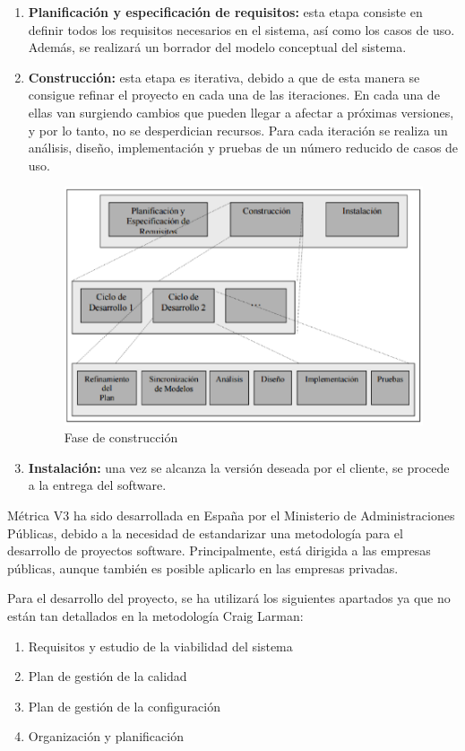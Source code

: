 \begin{enumerate}[1.]
\item \textbf{Planificación y especificación de requisitos:} esta etapa consiste en definir todos los requisitos necesarios en el sistema, así como los casos de uso. Además, se realizará un borrador del modelo conceptual del sistema.
\item \textbf{Construcción:} esta etapa es iterativa, debido a que de esta manera se consigue refinar el proyecto en cada una de las iteraciones. En cada una de ellas van surgiendo cambios que pueden llegar a afectar a próximas versiones, y por lo tanto, no se desperdician recursos. Para cada iteración se realiza un análisis, diseño, implementación y pruebas de un número reducido de casos de uso.
\begin{figure}[H]
\begin{center}
\includegraphics[width=1\textwidth]{./img/Metodologia.png}
\end{center}
\caption{Fase de construcción}
\label{tab:horasTotales}
\end{figure}

\item \textbf{Instalación:} una vez se alcanza la versión deseada por el cliente, se procede a la entrega del software.
\end{enumerate}
\par Métrica V3 ha sido desarrollada en España por el Ministerio de Administraciones Públicas, debido a la necesidad de estandarizar una metodología para el desarrollo de proyectos software. Principalmente, está dirigida a las empresas públicas, aunque también es posible aplicarlo en las empresas privadas.
\par Para el desarrollo del proyecto, se ha utilizará los siguientes apartados ya que no están tan detallados en la metodología Craig Larman:
\begin{enumerate}[1.]
\item Requisitos y estudio de la viabilidad del sistema
\item Plan de gestión de la calidad
\item Plan de gestión de la configuración
\item Organización y planificación
\end{enumerate}
